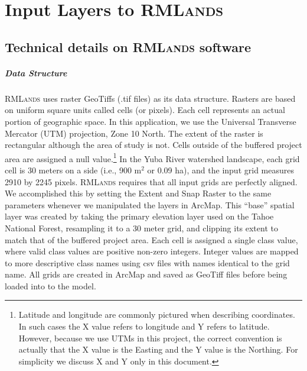 \appendix




\chapter{Input Layers to \textsc{RMLands}}
\label{app:inputs}

\section{Technical details on \textsc{RMLands} software}
\label{app:rmlspecs}

\paragraph{Data Structure} \textsc{RMLands} uses raster GeoTiffs (.tif files) as its data structure. Rasters are based on uniform square units called cells (or pixels). Each cell represents an actual portion of geographic space. In this application, we use the Universal Transverse Mercator (UTM) projection, Zone 10 North. The extent of the raster is rectangular although the area of study is not. Cells outside of the buffered project area are assigned a null value.\footnote{Latitude and longitude are commonly pictured when describing coordinates. In such cases the X value refers to longitude and Y refers to latitude. However, because we use UTMs in this project, the correct convention is actually that the X value is the Easting and the Y value is the Northing. For simplicity we discuss X and Y only in this document.} In the Yuba River watershed landscape, each grid cell is 30 meters on a side (i.e., 900 m$^2$ or 0.09 ha), and the input grid measures 2910 by 2245 pixels. \textsc{RMLands} requires that all input grids are perfectly aligned. We accomplished this by setting the Extent and Snap Raster to the same parameters whenever we manipulated the layers in ArcMap. This ``base'' spatial layer was created by taking the primary elevation layer used on the Tahoe National Forest, resampling it to a 30 meter grid, and clipping its extent to match that of the buffered project area. Each cell is assigned a single class value, where valid class values are positive non-zero integers. Integer values are mapped to more descriptive class names using csv files with names identical to the grid name. All grids are created in ArcMap and saved as GeoTiff files before being loaded into to the model. 


